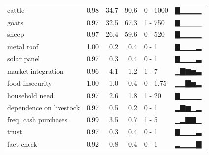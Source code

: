 \documentclass[
  11pt,
]{article}
\begin{document}
\begin{landscape}
\begin{table}
\begin{tabular}{lrrrll}
\addlinespace
cattle & 0.98 & 34.7 & 90.6 & 0 - 1000 & ▇▁▁▁▁\\
goats & 0.97 & 32.5 & 67.3 & 1 - 750 & ▇▁▁▁▁\\
sheep & 0.97 & 26.4 & 59.6 & 0 - 520 & ▇▁▁▁▁\\
metal roof & 1.00 & 0.2 & 0.4 & 0 - 1 & ▇▁▁▁▂\\
solar panel & 0.97 & 0.3 & 0.4 & 0 - 1 & ▇▁▁▁▃\\
\addlinespace
market integration & 0.96 & 4.1 & 1.2 & 1 - 7 & ▁▇▆▅▃\\
food insecurity & 1.00 & 1.0 & 0.4 & 0 - 1.75 & ▁▁▇▅▂\\
household need & 0.97 & 2.6 & 1.8 & 1 - 20 & ▇▁▁▁▁\\
dependence on livestock & 0.97 & 0.5 & 0.2 & 0 - 1 & ▂▇▆▁▂\\
freq. cash purchases & 0.99 & 3.5 & 0.7 & 1 - 5 & ▁▂▇▇▁\\
\addlinespace
trust & 0.97 & 0.3 & 0.4 & 0 - 1 & ▇▁▁▁▃\\
fact-check & 0.92 & 0.8 & 0.4 & 0 - 1 & ▂▁▁▁▇\\
\bottomrule
\end{tabular}
\end{table}

\end{landscape}
\end{document}
